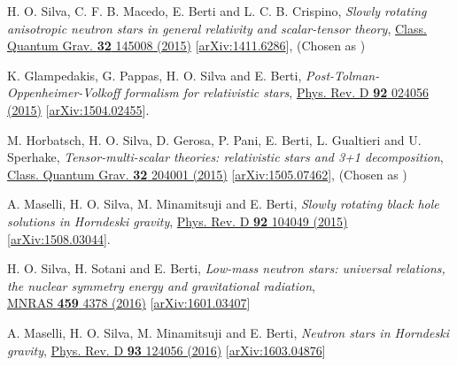 \documentclass[10pt]{article}
\newcommand{\MYhref}[3][blue]{\href{#2}{\color{#1}{#3}}}
\begin{document}
\begin{bibenum}
    \item H. O. Silva, C. F. B. Macedo, E. Berti and L. C. B. Crispino,
    \emph{Slowly rotating anisotropic neutron stars in general relativity and scalar-tensor theory},
    \href{http://iopscience.iop.org/article/10.1088/0264-9381/32/14/145008/meta}{Class. Quantum Grav. {\bf32} 145008 (2015)}
    [\href{http://arxiv.org/abs/1411.6286}{arXiv:1411.6286}],
    (Chosen as
    \MYhref[venetianred]{http://iopscience.iop.org/collections}{\sc IOPSelect})
    \label{itm:anisostar}

    \item K. Glampedakis, G. Pappas, H. O. Silva and E. Berti,
    \emph{Post-Tolman-Oppenheimer-Volkoff formalism for relativistic stars},
    \href{http://journals.aps.org/prd/abstract/10.1103/PhysRevD.92.024056}{Phys. Rev. D {\bf92} 024056 (2015)}
    [\href{http://arxiv.org/abs/1504.02455}{arXiv:1504.02455}].

    \item M. Horbatsch, H. O. Silva, D. Gerosa, P. Pani, E. Berti, L. Gualtieri
    and U. Sperhake,
    \emph{Tensor-multi-scalar theories: relativistic stars and 3+1 decomposition},
    \href{http://iopscience.iop.org/article/10.1088/0264-9381/32/20/204001/meta;jsessionid=575DFA8E53663683D64E28DF82CE0294.c1}{Class. Quantum Grav.
    {\bf32} 204001 (2015)}
    [\href{http://arxiv.org/abs/1505.07462}{arXiv:1505.07462}],
    (Chosen as
    \MYhref[venetianred]{http://iopscience.iop.org/collections}{\sc IOPSelect})
    \label{itm:multiscalar}

    \item A. Maselli, H. O. Silva, M. Minamitsuji and E. Berti,
    \emph{Slowly rotating black hole solutions in Horndeski gravity},
    \href{http://journals.aps.org/prd/abstract/10.1103/PhysRevD.92.104049}{Phys. Rev. D {\bf92} 104049 (2015)}
    [\href{http://arxiv.org/abs/1508.03044}{arXiv:1508.03044}].
    \label{itm:horndeski}

    \item H. O. Silva, H. Sotani and E. Berti,
    \emph{Low-mass neutron stars: universal relations, the nuclear symmetry energy and gravitational radiation},\\
    \href{http://mnras.oxfordjournals.org/content/459/4/4378}{MNRAS {\bf459}
    4378 (2016)}
    [\href{http://arxiv.org/abs/1601.03407}{arXiv:1601.03407}]

    \item A. Maselli, H. O. Silva, M. Minamitsuji and E. Berti,
    \emph{Neutron stars in Horndeski gravity},
    \href{http://journals.aps.org/prd/abstract/10.1103/PhysRevD.93.124056}{Phys. Rev. D {\bf93} 124056 (2016)}
    [\href{https://arxiv.org/abs/1603.04876}{arXiv:1603.04876}]


\end{bibenum}
\end{document}
